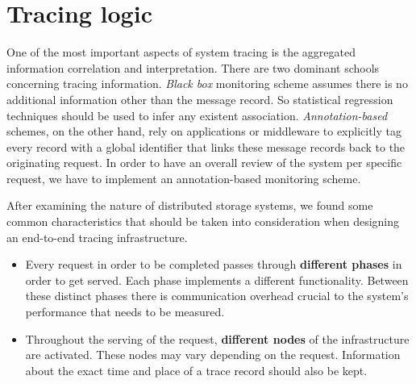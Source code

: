 \documentclass[a4paper,10pt,twocolumn]{article}
\begin{document}
\section{Tracing logic} One of the most important aspects of system tracing is
the aggregated information correlation and interpretation. There are two
dominant schools concerning tracing information. \emph{Black box} monitoring
scheme assumes there is no additional information other than the message record.
So statistical regression techniques should be used to infer any existent
association.  \emph{Annotation-based} schemes, on the other hand, rely on
applications or middleware to explicitly tag every record with a global
identifier that links these message records back to the originating request. In
order to have an overall review of the system per specific request, we have to
implement an annotation-based monitoring scheme.

After examining the nature of distributed storage systems, we found some common
characteristics that should be taken into consideration when designing an
end-to-end tracing infrastructure.
\begin{itemize}
\item Every request in order to be completed passes through \textbf{different 
phases} in order to get served. Each phase implements a different functionality.
Between these distinct phases there is communication overhead crucial to the 
system's performance that needs to be measured. 
\item Throughout the serving of the request, \textbf{different nodes} of the 
infrastructure are activated. These nodes may vary depending on the request.
Information about the exact time and place of a trace record should also be 
kept.
\end{itemize}
\end{document}
